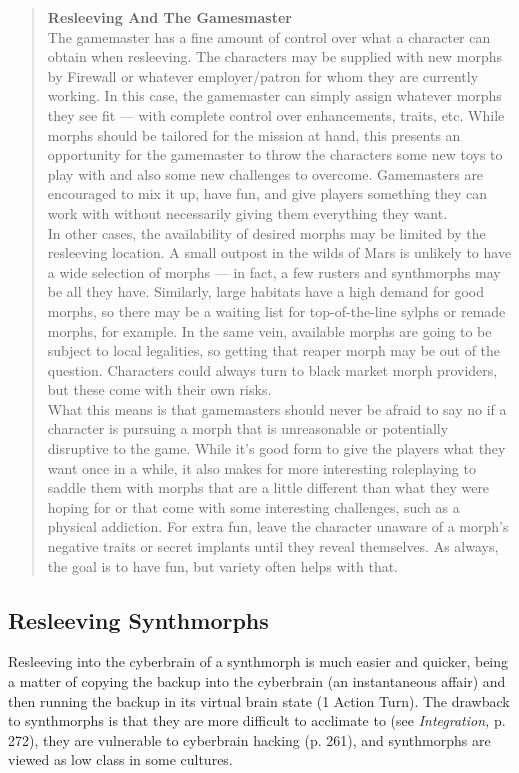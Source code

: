 \begin{quotation} \textbf{Resleeving And The Gamesmaster} \\ The gamemaster has a fine amount of control over what a character can obtain when resleeving. The characters may be supplied with new morphs by Firewall or whatever employer/patron for whom they are currently working. In this case, the gamemaster can simply assign whatever morphs they see fit — with complete control over enhancements, traits, etc. While morphs should be tailored for the mission at hand, this presents an opportunity for the gamemaster to throw the characters some new toys to play with and also some new challenges to overcome. Gamemasters are encouraged to mix it up, have fun, and give players something they can work with without necessarily giving them everything they want.\\ In other cases, the availability of desired morphs may be limited by the resleeving location. A small outpost in the wilds of Mars is unlikely to have a wide selection of morphs — in fact, a few rusters and synthmorphs may be all they have. Similarly, large habitats have a high demand for good morphs, so there may be a waiting list for top-of-the-line sylphs or remade morphs, for example. In the same vein, available morphs are going to be subject to local legalities, so getting that reaper morph may be out of the question. Characters could always turn to black market morph providers, but these come with their own risks.\\ What this means is that gamemasters should never be afraid to say no if a character is pursuing a morph that is unreasonable or potentially disruptive to the game. While it’s good form to give the players what they want once in a while, it also makes for more interesting roleplaying to saddle them with morphs that are a little different than what they were hoping for or that come with some interesting challenges, such as a physical addiction. For extra fun, leave the character unaware of a morph’s negative traits or secret implants until they reveal themselves. As always, the goal is to have fun, but variety often helps with that. \end{quotation} 

\subsection{Resleeving Synthmorphs} 

Resleeving into the cyberbrain of a synthmorph is much easier and quicker, being a matter of copying the backup into the cyberbrain (an instantaneous affair) and then running the backup in its virtual brain state (1 Action Turn). The drawback to synthmorphs is that they are more difficult to acclimate to (see \textit{Integration,} p. 272), they are vulnerable to cyberbrain hacking (p. 261), and synthmorphs are viewed as low class in some cultures. 

